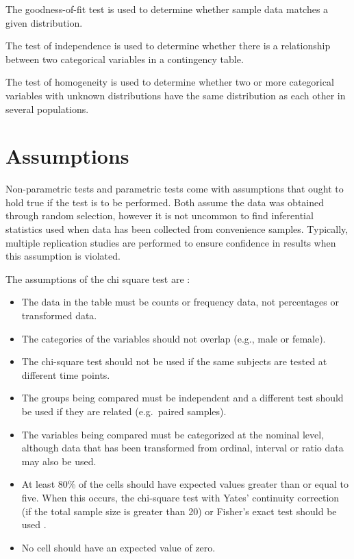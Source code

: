\documentclass[
]{book}
\begin{document}
The goodness-of-fit test is used to determine whether sample data matches a given distribution.

The test of independence is used to determine whether there is a relationship between two categorical variables in a contingency table.

The test of homogeneity is used to determine whether two or more categorical variables with unknown distributions have the same distribution as each other in several populations.

\hypertarget{assumptions}{%
\section{Assumptions}\label{assumptions}}

Non-parametric tests and parametric tests come with assumptions that ought to hold true if the test is to be performed. Both assume the data was obtained through random selection, however it is not uncommon to find inferential statistics used when data has been collected from convenience samples. Typically, multiple replication studies are performed to ensure confidence in results when this assumption is violated.

The assumptions of the chi square test are \citep{McHugh2013}:

\begin{itemize}
\item
  The data in the table must be counts or frequency data, not percentages or transformed data.
\item
  The categories of the variables should not overlap (e.g., male or female).
\item
  The chi-square test should not be used if the same subjects are tested at different time points.
\item
  The groups being compared must be independent and a different test should be used if they are related (e.g.~paired samples).
\item
  The variables being compared must be categorized at the nominal level, although data that has been transformed from ordinal, interval or ratio data may also be used.
\item
  At least 80\% of the cells should have expected values greater than or equal to five. When this occurs, the chi-square test with Yates' continuity correction (if the total sample size is greater than 20) or Fisher's exact test should be used \citep{chica}.
\item
  No cell should have an expected value of zero.
\end{itemize}
\end{document}
